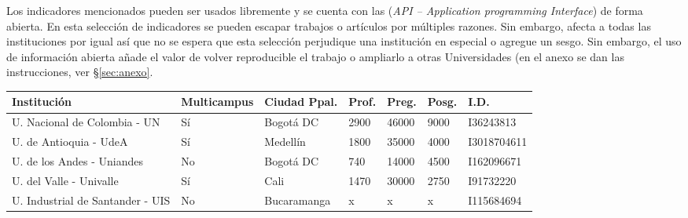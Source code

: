 \documentclass[
11pt, %
letter, %
oneside, %
]{article} %
\begin{document}
Los indicadores mencionados pueden ser usados libremente y se cuenta con las (\textit{API -- Application programming Interface}) de forma abierta. En esta selección de indicadores se pueden escapar trabajos o artículos por múltiples razones. Sin embargo, afecta a todas las instituciones por igual así que no se espera que esta selección perjudique una institución en especial o agregue un sesgo. Sin embargo, el uso de información abierta añade el valor de volver reproducible el trabajo o ampliarlo a otras Universidades (en el anexo se dan las instrucciones, ver \S \ref{sec:anexo}.

\FloatBarrier
\begin{small}
	\begin{table}[ht!] 
		\begin{center} 
			\small %
			\begin{tabular}{|M{2.8cm}|M{1.5cm}|M{2.3cm}|M{1.4cm}|M{1.4cm}|M{1.4cm}|M{1.8cm}|} \hline 
				\vspace{2mm} \large \textbf{Institución}   & \vspace{2mm} \large \textbf{Multi\-campus} &\vspace{2mm} \large \textbf{Ciudad Ppal.} & \vspace{2mm} \large \textbf{Prof.} & \vspace{2mm} \large \textbf{Preg.} & \vspace{2mm} \large \textbf{Posg.} &\vspace{2mm} \large \textbf{I.D.}\\[2ex]
				\hline
				\vspace{2mm} U. Nacional de Colombia \vspace{1mm} -  UN & Sí & Bogotá DC &   2900 & 46000 & 9000  & I36243813 \\ \hline
				\vspace{2mm} 	U. de Antioquia  \vspace{1mm}-  UdeA & Sí & Medellín & 1800 & 35000 & 4000 & I3018704611 \\ \hline
				\vspace{2mm} U. de los Andes  \vspace{1mm} - Uniandes & No & Bogotá DC & 740 & 14000 & 4500 & I162096671\\ \hline
				\vspace{2mm} U. del Valle  \vspace{1mm} - Univalle & Sí & Cali & 1470 & 30000 & 2750 & I91732220 \\ \hline
				\vspace{2mm} U. Industrial de Santander  \vspace{1mm} - UIS & No & Bucaramanga & x & x & x & I115684694\\ \hline

\end{tabular}
\end{center}
\end{table}
\end{small}
\end{document}
